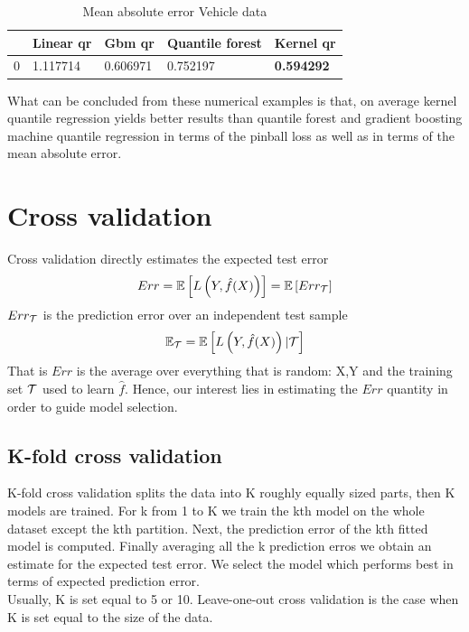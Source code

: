 \begin{table}
    \caption{Mean absolute error Vehicle data}
    \begin{tabular}{lllll}
    \toprule
     & Linear qr & Gbm qr & Quantile forest & Kernel qr \\
    \midrule
    0 & 1.117714 & 0.606971 & 0.752197 & \textbf{0.594292} \\
    \bottomrule
    \end{tabular}
\end{table}
What can be concluded from these numerical examples is that, on average kernel quantile regression yields better results than quantile forest \cite{meinshausen2006quantile} and gradient boosting machine quantile regression \cite {friedman2001greedy} in terms of the pinball loss as well as in terms of the mean absolute error.



\section{Cross validation}\label{appendix:cross_validation}
Cross validation directly estimates the expected test error
\begin{equation}
    Err=\mathbb{E}\left[L\left(Y,\hat{f}(X)\right)\right]=\mathbb{E}\left[Err_{\mathcal{T}}\right]
\end{equation}
$Err_{\mathcal{T}}$ is the prediction error over an independent test sample
\begin{equation}
    \mathbb{E}_{\mathcal{T}}=\mathbb{E}\left[L\left(Y,\hat{f}(X)\right)| \mathcal{T} \right]
\end{equation}
That is $Err$ is the average over everything that is random: X,Y and the training set $\mathcal{T}$ used to learn $\hat{f}$. Hence, our interest lies in estimating the $Err$ quantity in order to guide model selection.
\subsection{K-fold cross validation}
K-fold cross validation splits the data into K roughly equally sized parts, then K models are trained. For k from 1 to K we train the kth model on the whole dataset except the kth partition. Next,  the prediction error of the kth fitted model is computed. Finally averaging all the k prediction erros we obtain an estimate for the expected test error. We select the model which performs best in terms of expected prediction error.
\\
Usually, K is set equal to 5 or 10. Leave-one-out cross validation is the case when K is set equal to the size of the data.
